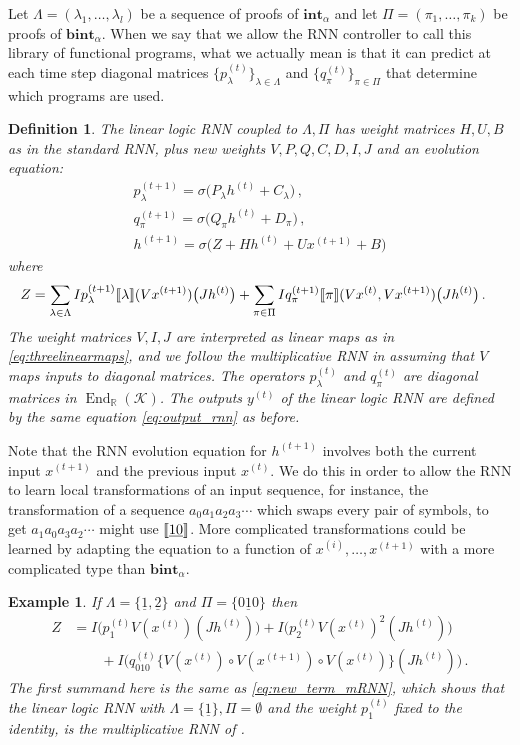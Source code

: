 \documentclass[english,letter paper,12pt,leqno]{article}
\theoremstyle{example}
\newtheorem{definition}[theorem]{Definition}
\newtheorem{example}[theorem]{Example}
\numberwithin{equation}{section}
\DeclareMathOperator{\End}{End}
\begin{document}
Let $\Lambda = (\lambda_1,\ldots,\lambda_l)$ be a sequence of proofs of $\textbf{int}_\alpha$ and let $\Pi = (\pi_1,\ldots,\pi_k)$ be proofs of $\textbf{bint}_\alpha$. When we say that we allow the RNN controller to call this library of functional programs, what we actually mean is that it can predict at each time step diagonal matrices $\{p^{(t)}_\lambda\}_{\lambda \in \Lambda}$ and $\{q^{(t)}_\pi\}_{\pi \in \Pi}$ that determine which programs are used.

\begin{definition} The \emph{linear logic} RNN coupled to $\Lambda, \Pi$ has weight matrices $H,U,B$ as in the standard RNN, plus new weights $V, P, Q, C, D, I, J$ and an evolution equation:
\begin{gather*}
p^{(t+1)}_\lambda = \sigma\big( P_\lambda h^{(t)} + C_\lambda \big)\,,\\
q^{(t+1)}_\pi = \sigma\big( Q_\pi h^{(t)} + D_\pi \big)\,,\\
h^{(t+1)} = \sigma\Big( Z + H h^{(t)} + U x^{(t+1)} + B\Big)
\end{gather*}
where
\begin{align*}
Z &= \sum_{\lambda \in \Lambda} Ip^{(t+1)}_\lambda\llbracket \lambda \rrbracket( Vx^{(t+1)} )\big( Jh^{(t)} \big) + \sum_{\pi \in \Pi} Iq^{(t+1)}_\pi\llbracket \pi \rrbracket( Vx^{(t)}, Vx^{(t+1)})\big( Jh^{(t)} \big)\,.
\end{align*}
The weight matrices $V,I,J$ are interpreted as linear maps as in \eqref{eq:threelinearmaps}, and we follow the multiplicative RNN in assuming that $V$ maps inputs to diagonal matrices. The operators $p^{(t)}_\lambda$ and $q^{(t)}_\pi$ are diagonal matrices in $\End_{\mathbb{R}}(\mathscr{K})$. The outputs $y^{(t)}$ of the linear logic RNN are defined by the same equation \eqref{eq:output_rnn} as before.
\end{definition}

Note that the RNN evolution equation for $h^{(t+1)}$ involves both the current input $x^{(t+1)}$ and the previous input $x^{(t)}$. We do this in order to allow the RNN to learn local transformations of an input sequence, for instance, the transformation of a sequence $a_0 a_1 a_2 a_3 \cdots$ which swaps every pair of symbols, to get $a_1 a_0 a_3 a_2 \cdots$ might use $\llbracket \underline{10} \rrbracket$. More complicated transformations could be learned by adapting the equation to a function of $x^{(i)}, \ldots, x^{(t+1)}$ with a more complicated type than $\textbf{bint}_\alpha$.

\begin{example} If $\Lambda = \{ \underline{1}, \underline{2} \}$ and $\Pi = \{ \underline{010} \}$ then
\begin{align*}
Z &= I\big(p_1^{(t)} V(x^{(t)})( Jh^{(t)}) \big) + I\big( p_2^{(t)} V(x^{(t)})^2(J h^{(t)}) \big)\\
&\qquad + I\Big( q^{(t)}_{010} \big\{ V(x^{(t)}) \circ V(x^{(t+1)}) \circ V(x^{(t)}) \big\}( J h^{(t)}) \Big)\,.
\end{align*}
The first summand here is the same as \eqref{eq:new_term_mRNN}, which shows that the linear logic RNN with $\Lambda = \{ \underline{1} \}, \Pi = \emptyset$ and the weight $p^{(t)}_1$ fixed to the identity, is the multiplicative RNN of \cite{sutskever}.
\end{example}
\end{document}
